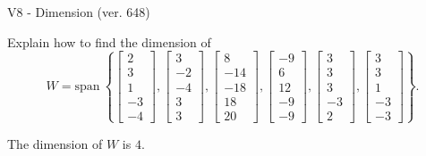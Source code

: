 \begin{exercise}
  \begin{exerciseTitle}V8 - Dimension (ver. 648)\end{exerciseTitle}
  \begin{exerciseStatement}
    Explain how to find the dimension of 
\[W=\mathrm{span}\ \left\{\left[\begin{array}{r}
2 \\
3 \\
1 \\
-3 \\
-4
\end{array}\right] , \left[\begin{array}{r}
3 \\
-2 \\
-4 \\
3 \\
3
\end{array}\right] , \left[\begin{array}{r}
8 \\
-14 \\
-18 \\
18 \\
20
\end{array}\right] , \left[\begin{array}{r}
-9 \\
6 \\
12 \\
-9 \\
-9
\end{array}\right] , \left[\begin{array}{r}
3 \\
3 \\
3 \\
-3 \\
2
\end{array}\right] , \left[\begin{array}{r}
3 \\
3 \\
1 \\
-3 \\
-3
\end{array}\right]\right\}.\]



  \end{exerciseStatement}
  \begin{exerciseAnswer}
   The dimension of \(W\) is  \(4\).
  


  \end{exerciseAnswer}
\end{exercise}